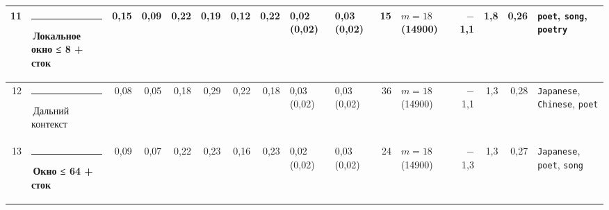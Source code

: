 \documentclass[10pt]{article}
\begin{document}
\begin{minipage}{\linewidth}
\begin{center}
{\begin{tabular}{|r|l|r|r|r|r|r|r|l|l|r|l|r|r|r|l|}
11 & \textcolor[HTML]{1BAF7A}{\rule{0.62em}{0.62em}}\,\textbf{Локальное окно ≤ 8 + сток} & 0,15 & 0,09 & 0,22 & 0,19 & 0,12 & 0,22 & 0,02 (0,02) & 0,03 (0,02) & 15 & $m{=}18$ (14900) & $-$1,1 & 1,8 & 0,26 & \texttt{\textvisiblespace{}poet}, \texttt{\textvisiblespace{}song}, \texttt{\textvisiblespace{}poetry} \\ \hline
12 & \textcolor[HTML]{C3C2B7}{\rule{0.62em}{0.62em}}\,Дальний контекст & 0,08 & 0,05 & 0,18 & 0,29 & 0,22 & 0,18 & 0,03 (0,02) & 0,03 (0,02) & 36 & $m{=}18$ (14900) & $-$1,1 & 1,3 & 0,28 & \texttt{\textvisiblespace{}Japanese}, \texttt{\textvisiblespace{}Chinese}, \texttt{\textvisiblespace{}poet} \\ \hline
13 & \textcolor[HTML]{EDA100}{\rule{0.62em}{0.62em}}\,\textbf{Окно ≤ 64 + сток} & 0,09 & 0,07 & 0,22 & 0,23 & 0,16 & 0,23 & 0,02 (0,02) & 0,03 (0,02) & 24 & $m{=}18$ (14900) & $-$1,3 & 1,3 & 0,27 & \texttt{\textvisiblespace{}Japanese}, \texttt{\textvisiblespace{}poet}, \texttt{\textvisiblespace{}song} \\ \hline
\hline\end{tabular}}\end{center}
\end{minipage}
\par\vspace{0.4em}
\end{document}
